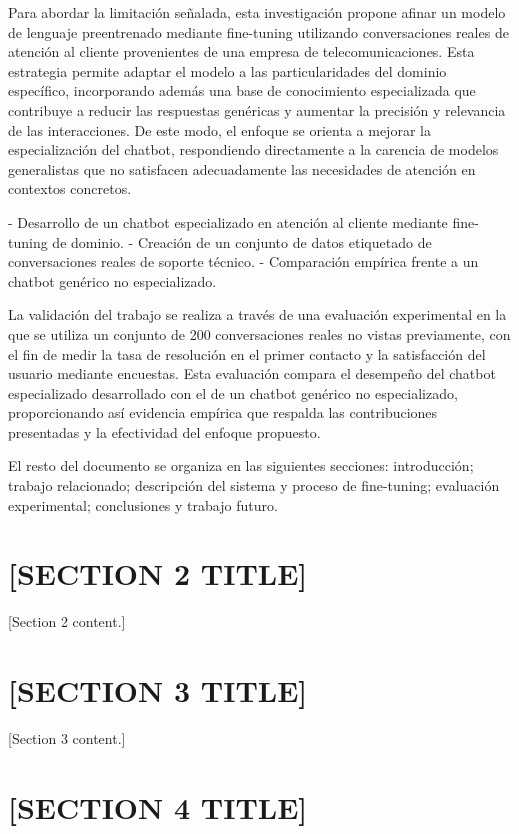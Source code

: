 \documentclass[journal]{IEEEtran}
\begin{document}
Para abordar la limitación señalada, esta investigación propone afinar un modelo de lenguaje preentrenado mediante fine-tuning utilizando conversaciones reales de atención al cliente provenientes de una empresa de telecomunicaciones. Esta estrategia permite adaptar el modelo a las particularidades del dominio específico, incorporando además una base de conocimiento especializada que contribuye a reducir las respuestas genéricas y aumentar la precisión y relevancia de las interacciones. De este modo, el enfoque se orienta a mejorar la especialización del chatbot, respondiendo directamente a la carencia de modelos generalistas que no satisfacen adecuadamente las necesidades de atención en contextos concretos.

- Desarrollo de un chatbot especializado en atención al cliente mediante fine-tuning de dominio.  
- Creación de un conjunto de datos etiquetado de conversaciones reales de soporte técnico.  
- Comparación empírica frente a un chatbot genérico no especializado.

La validación del trabajo se realiza a través de una evaluación experimental en la que se utiliza un conjunto de 200 conversaciones reales no vistas previamente, con el fin de medir la tasa de resolución en el primer contacto y la satisfacción del usuario mediante encuestas. Esta evaluación compara el desempeño del chatbot especializado desarrollado con el de un chatbot genérico no especializado, proporcionando así evidencia empírica que respalda las contribuciones presentadas y la efectividad del enfoque propuesto.

El resto del documento se organiza en las siguientes secciones: introducción; trabajo relacionado; descripción del sistema y proceso de fine-tuning; evaluación experimental; conclusiones y trabajo futuro.


\section{[SECTION 2 TITLE]}
\label{sec:section2}

[Section 2 content.]


\section{[SECTION 3 TITLE]}
\label{sec:section3}

[Section 3 content.]


\section{[SECTION 4 TITLE]}
\label{sec:section4}
\end{document}
